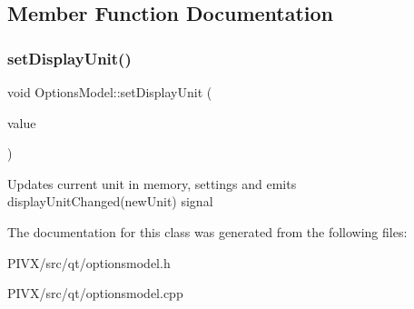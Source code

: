 \subsection{Member Function Documentation}
\mbox{\label{class_options_model_a42efacc748130848acc20247a7ed4617}} 
\subsubsection{\texorpdfstring{set\+Display\+Unit()}{setDisplayUnit()}}
{\footnotesize\ttfamily void Options\+Model\+::set\+Display\+Unit (\begin{DoxyParamCaption}\item[{const Q\+Variant \&}]{value }\end{DoxyParamCaption})}

Updates current unit in memory, settings and emits display\+Unit\+Changed(new\+Unit) signal 

The documentation for this class was generated from the following files\+:\begin{DoxyCompactItemize}
\item 
P\+I\+V\+X/src/qt/optionsmodel.\+h\item 
P\+I\+V\+X/src/qt/optionsmodel.\+cpp\end{DoxyCompactItemize}
